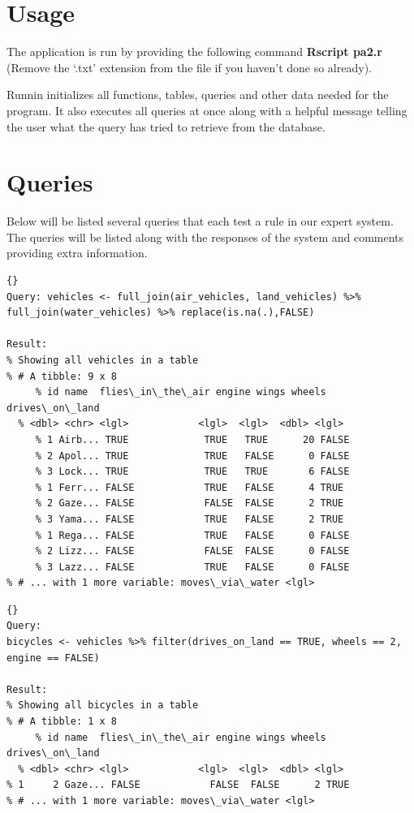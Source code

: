 \section{Usage} \label{man-usage}
The application is run by providing the following command \textbf{Rscript pa2.r}
(Remove the `.txt' extension from the file if you haven't done so already).

Runnin initializes all functions, tables, queries and other data needed for the
program. It also executes all queries at once along with a helpful message
telling the user what the query has tried to retrieve from the database.

\newpage
\section{Queries} \label{man-queries}
Below will be listed several queries that each test a rule in our expert system.
The queries will be listed along with the responses of the system and comments
providing extra information.

\begin{lstlisting}{}
Query: vehicles <- full_join(air_vehicles, land_vehicles) %>% full_join(water_vehicles) %>% replace(is.na(.),FALSE)

Result:
% Showing all vehicles in a table
% # A tibble: 9 x 8
     % id name  flies\_in\_the\_air engine wings wheels drives\_on\_land
  % <dbl> <chr> <lgl>            <lgl>  <lgl>  <dbl> <lgl>
     % 1 Airb... TRUE             TRUE   TRUE      20 FALSE
     % 2 Apol... TRUE             TRUE   FALSE      0 FALSE
     % 3 Lock... TRUE             TRUE   TRUE       6 FALSE
     % 1 Ferr... FALSE            TRUE   FALSE      4 TRUE
     % 2 Gaze... FALSE            FALSE  FALSE      2 TRUE
     % 3 Yama... FALSE            TRUE   FALSE      2 TRUE
     % 1 Rega... FALSE            TRUE   FALSE      0 FALSE
     % 2 Lizz... FALSE            FALSE  FALSE      0 FALSE
     % 3 Lazz... FALSE            TRUE   FALSE      0 FALSE
% # ... with 1 more variable: moves\_via\_water <lgl>
\end{lstlisting}

\begin{lstlisting}{}
Query:
bicycles <- vehicles %>% filter(drives_on_land == TRUE, wheels == 2, engine == FALSE)

Result:
% Showing all bicycles in a table
% # A tibble: 1 x 8
     % id name  flies\_in\_the\_air engine wings wheels drives\_on\_land
  % <dbl> <chr> <lgl>            <lgl>  <lgl>  <dbl> <lgl>
% 1     2 Gaze... FALSE            FALSE  FALSE      2 TRUE
% # ... with 1 more variable: moves\_via\_water <lgl>
\end{lstlisting}


